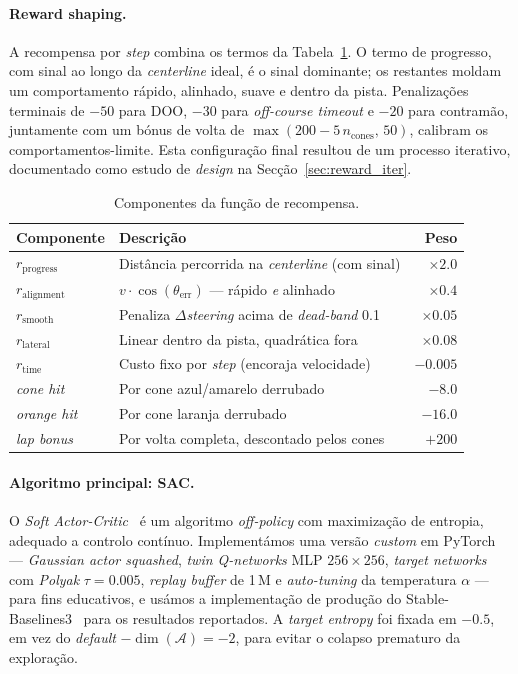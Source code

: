 \documentclass[runningheads]{llncs}
\begin{document}
\paragraph{Reward shaping.} A recompensa por \textit{step} combina os termos da Tabela~\ref{tab:reward}. O termo de progresso, com sinal ao longo da \textit{centerline} ideal, é o sinal dominante; os restantes moldam um comportamento rápido, alinhado, suave e dentro da pista. Penalizações terminais de $-50$ para DOO, $-30$ para \textit{off-course timeout} e $-20$ para contramão, juntamente com um bónus de volta de $\max(200 - 5\,n_\mathrm{cones},\,50)$, calibram os comportamentos-limite. Esta configuração final resultou de um processo iterativo, documentado como estudo de \textit{design} na Secção~\ref{sec:reward_iter}.

\begin{table}[t]
\centering
\caption{Componentes da função de recompensa.}
\label{tab:reward}
\small
\begin{tabular}{llr}
\toprule
\textbf{Componente} & \textbf{Descrição} & \textbf{Peso} \\
\midrule
$r_\mathrm{progress}$ & Distância percorrida na \textit{centerline} (com sinal) & $\times 2.0$ \\
$r_\mathrm{alignment}$ & $v \cdot \cos(\theta_\mathrm{err})$ --- rápido \emph{e} alinhado & $\times 0.4$ \\
$r_\mathrm{smooth}$ & Penaliza $\Delta$\textit{steering} acima de \textit{dead-band} 0.1 & $\times 0.05$ \\
$r_\mathrm{lateral}$ & Linear dentro da pista, quadrática fora & $\times 0.08$ \\
$r_\mathrm{time}$ & Custo fixo por \textit{step} (encoraja velocidade) & $-0.005$ \\
\textit{cone hit} & Por cone azul/amarelo derrubado & $-8.0$ \\
\textit{orange hit} & Por cone laranja derrubado & $-16.0$ \\
\textit{lap bonus} & Por volta completa, descontado pelos cones & $+200$ \\
\bottomrule
\end{tabular}
\end{table}

\paragraph{Algoritmo principal: SAC.} O \textit{Soft Actor-Critic}~\cite{haarnoja2018} é um algoritmo \textit{off-policy} com maximização de entropia, adequado a controlo contínuo. Implementámos uma versão \textit{custom} em PyTorch --- \textit{Gaussian actor squashed}, \textit{twin Q-networks} MLP $256{\times}256$, \textit{target networks} com \textit{Polyak} $\tau{=}0.005$, \textit{replay buffer} de 1\,M e \textit{auto-tuning} da temperatura $\alpha$ --- para fins educativos, e usámos a implementação de produção do Stable-Baselines3~\cite{raffin2021} para os resultados reportados. A \textit{target entropy} foi fixada em $-0.5$, em vez do \textit{default} $-\dim(\mathcal{A}){=}-2$, para evitar o colapso prematuro da exploração.
\end{document}
